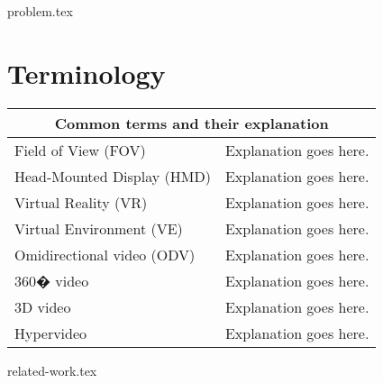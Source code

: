 \documentclass[a4paper,11pt,twoside]{report}
\begin{document}





{problem.tex}






\section{Terminology}

\begin{tabular}{ | p{5.5cm} | p{6.5cm} |  }
	\hline
     	\multicolumn{2}{|c|}{Common terms and their explanation} \\
     	\hline
	Field of View (FOV) & Explanation goes here. \\
    	\hline
     	Head-Mounted Display (HMD) & Explanation goes here. \\
    	\hline
     	Virtual Reality (VR) & Explanation goes here. \\
    	\hline
	Virtual Environment (VE) & Explanation goes here. \\
     	\hline
    	Omidirectional video (ODV) & Explanation goes here. \\
    	\hline
     	360� video & Explanation goes here. \\
     	\hline
     	3D video & Explanation goes here. \\
     	\hline
     	Hypervideo & Explanation goes here. \\
	\hline
\end{tabular}
{related-work.tex}
\end{document}
